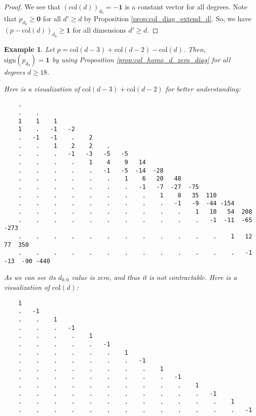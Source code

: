 \documentclass[11pt]{article}
\newtheorem{example}[theorem]{Example}
\begin{document}
\begin{proof}
  We see that \( (\mathrm{col}(d))_{d_0} = -\mathbf 1 \) is a constant vector for all degrees. Note that \( p_{d_0} \geq \mathbf 0 \) for all \( d' \geq d \) by Proposition \ref{prop:col_diag_extend_d}. So, we have \( (p - \mathrm{col}(d))_{d_0} \geq \mathbf 1 \) for all dimensions \( d' \geq d \).
\end{proof}


\begin{example}
  Let \( p = \mathrm{col}(d-3) + \mathrm{col}(d-2) - \mathrm{col}(d) \).
  Then, \( \mathrm{sign}(p_{d_0}) = \mathbf{1} \) by using Proposition \ref{prop:col_homo_d_zero_diag} for all degrees \( d \geq 18 \).

  Here is a visualization of \( \mathrm{col}(d-3) + \mathrm{col}(d-2) \) for better understanding:
  \begingroup
  \fontsize{8pt}{10pt}\selectfont
  \begin{verbatim}
    . 
    .    . 
    1    1    1 
    1    .   -1   -2 
    .   -1   -1    .    2 
    .    .    1    2    2    . 
    .    .    .   -1   -3   -5   -5 
    .    .    .    .    1    4    9   14 
    .    .    .    .    .   -1   -5  -14  -28 
    .    .    .    .    .    .    1    6   20   48 
    .    .    .    .    .    .    .   -1   -7  -27  -75 
    .    .    .    .    .    .    .    .    1    8   35  110 
    .    .    .    .    .    .    .    .    .   -1   -9  -44 -154 
    .    .    .    .    .    .    .    .    .    .    1   10   54  208 
    .    .    .    .    .    .    .    .    .    .    .   -1  -11  -65 -273 
    .    .    .    .    .    .    .    .    .    .    .    .    1   12   77  350 
    .    .    .    .    .    .    .    .    .    .    .    .    .   -1  -13  -90 -440
  \end{verbatim}
  \endgroup
  As we can see its \( d_{0,0} \) value is zero, and thus it is not contractable. Here is a visualization of \( \mathrm{col}(d) \):
  \begingroup
  \fontsize{8pt}{10pt}\selectfont
  \begin{verbatim}
    1 
    .   -1 
    .    .    1 
    .    .    .   -1 
    .    .    .    .    1 
    .    .    .    .    .   -1 
    .    .    .    .    .    .    1 
    .    .    .    .    .    .    .   -1 
    .    .    .    .    .    .    .    .    1 
    .    .    .    .    .    .    .    .    .   -1 
    .    .    .    .    .    .    .    .    .    .    1 
    .    .    .    .    .    .    .    .    .    .    .   -1 
    .    .    .    .    .    .    .    .    .    .    .    .    1 
    .    .    .    .    .    .    .    .    .    .    .    .    .   -1 

\end{verbatim}
\end{example}
\end{document}
